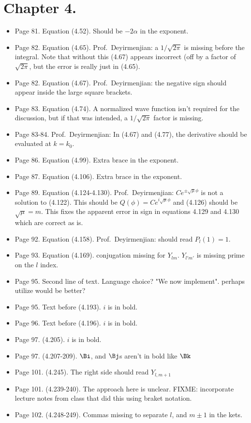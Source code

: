 \section{Chapter 4.}
\begin{itemize}
\item Page 81.  Equation (4.52).  Should be $-2\alpha$ in the exponent.
\item Page 82.  Equation (4.65).  Prof.\ Deyirmenjian: a $1/\sqrt{2\pi}$ is missing before the integral.  Note that without this (4.67) appears incorrect (off by a factor of $\sqrt{2\pi}$, but the error is really just in (4.65).
\item Page 82.  Equation (4.67).  Prof.\ Deyirmenjian: the negative sign should appear inside the large square brackets.
\item Page 83.  Equation (4.74).  A normalized wave function isn't required for the discussion, but if that was intended, a $1/\sqrt{2\pi}$ factor is missing.
\item Page 83-84.  Prof.\ Deyirmenjian: In (4.67) and (4.77), the derivative should be evaluated at $k=k_0$.
\item Page 86.  Equation (4.99).  Extra brace in the exponent.
\item Page 87.  Equation (4.106).  Extra brace in the exponent.
\item Page 89.  Equation (4.124-4.130).  Prof.\ Deyirmenjian: $C e^{\pm \sqrt{\mu}\phi}$ is not a solution to (4.122).  This should be $Q(\phi) = C e^{i \sqrt{\mu} \phi}$ and (4.126) should be $\sqrt{\mu} = m$.  This fixes the apparent error in sign in equations 4.129 and 4.130 which are correct as is.
\item Page 92.  Equation (4.158).  Prof.\ Deyirmenjian: should read $P_l(1) = 1$.
\item Page 93.  Equation (4.169).  conjugation missing for $Y_{lm}$.  $Y_{l'm'}$ is missing prime on the $l$ index.
\item Page 95.  Second line of text.  Language choice?  "We now implement".  perhaps utilize would be better?
\item Page 95.  Text before (4.193).  $i$ is in bold.
\item Page 96.  Text before (4.196).  $i$ is in bold.
\item Page 97.  (4.205).  $i$ is in bold.
\item Page 97.  (4.207-209).  $\Bi$, and $\Bj$s aren't in bold like $\Bk$
\item Page 101.  (4.245).  The right side should read $Y_{l,m+1}$
\item Page 101.  (4.239-240).  The approach here is unclear.  FIXME: incorporate lecture notes from class that did this using braket notation.
\item Page 102.  (4.248-249).  Commas missing to separate $l$, and $m\pm 1$ in the kets.
\end{itemize}

